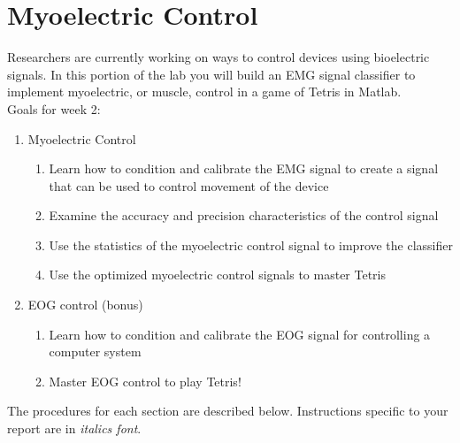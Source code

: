 \documentclass[10pt,oneside,a4paper]{article}
\begin{document}
\section{Myoelectric Control}
Researchers are currently working on ways to control devices using bioelectric signals. In this portion of the lab you will build an EMG signal classifier to implement myoelectric, or muscle, control in a game of Tetris in Matlab. \\
Goals for week 2:
\begin{enumerate}
\item Myoelectric Control
\begin{enumerate}
\item Learn how to condition and calibrate the EMG signal to create a signal that can be used to control movement of the device
\item Examine the accuracy and precision characteristics of the control signal
\item Use the statistics of the myoelectric control signal to improve the classifier
\item Use the optimized myoelectric control signals to master Tetris
\end{enumerate}
\item EOG control (bonus)
\begin{enumerate}
\item Learn how to condition and calibrate the EOG signal for controlling a computer system
\item Master EOG control to play Tetris!
\end{enumerate}
\end{enumerate}
The procedures for each section are described below. Instructions specific to your report are in \textit{italics font}.
\end{document}
